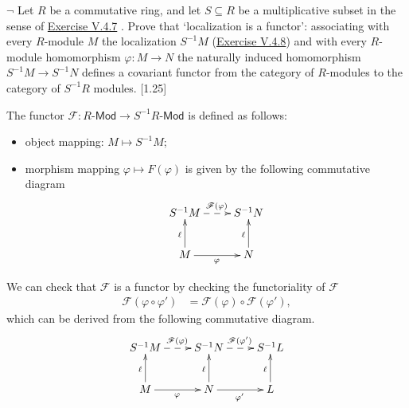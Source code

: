 \begin{problem}[1.4]
$\neg$ Let $R$ be a commutative ring, and let $S \subseteq R$ be a multiplicative subset in the sense of \hyperlink{Exercise V.4.7}{Exercise V.4.7} . Prove that `localization is a functor': associating with every $R$-module $M$ the localization $S^{-1} M$ (\hyperlink{Exercise V.4.8}{Exercise V.4.8}) and with every $R$-module homomorphism $\varphi: M \rightarrow N$ the naturally induced homomorphism $S^{-1} M \rightarrow S^{-1} N$ defines a covariant functor from the category of $R$-modules to the category of $S^{-1} R$ modules. [1.25]
\end{problem}
\begin{solution}

	The functor $\mathscr{F}: R\text{-}\mathsf{Mod} \rightarrow S^{-1} R\text{-}\mathsf{Mod}$ is defined as follows:
	\begin{itemize}
		\item object mapping: $M \mapsto S^{-1} M$;
		\item morphism mapping $\varphi\mapsto F(\varphi)$ is given by the following commutative diagram
		\[\xymatrix{
			S^{-1}M
			\ar@{-->}[r]^{\mathscr{F}(\varphi)} & S^{-1}N\\
			M \ar[u]^{\ell}\ar[r]_{\varphi} &  N  \ar[u]^{\ell}
		}\]
	\end{itemize}
	We can check that $\mathscr{F}$ is a functor by checking the functoriality of $\mathscr{F}$
	\begin{align*}
		\mathscr{F}\left(\varphi\circ\varphi'\right)&=\mathscr{F}(\varphi)\circ\mathscr{F}(\varphi'),
	\end{align*}
	which can be derived from the following commutative diagram.
	\[\xymatrix{
			S^{-1}M
			\ar@{-->}[r]^{\mathscr{F}(\varphi)} & S^{-1}N\ar@{-->}[r]^{\mathscr{F}(\varphi')}& S^{-1}L\\
			M \ar[u]^{\ell}\ar[r]_{\varphi} &  N  \ar[u]^{\ell}\ar[r]_{\varphi'}& L  \ar[u]^{\ell}
		}\]
	
\end{solution}